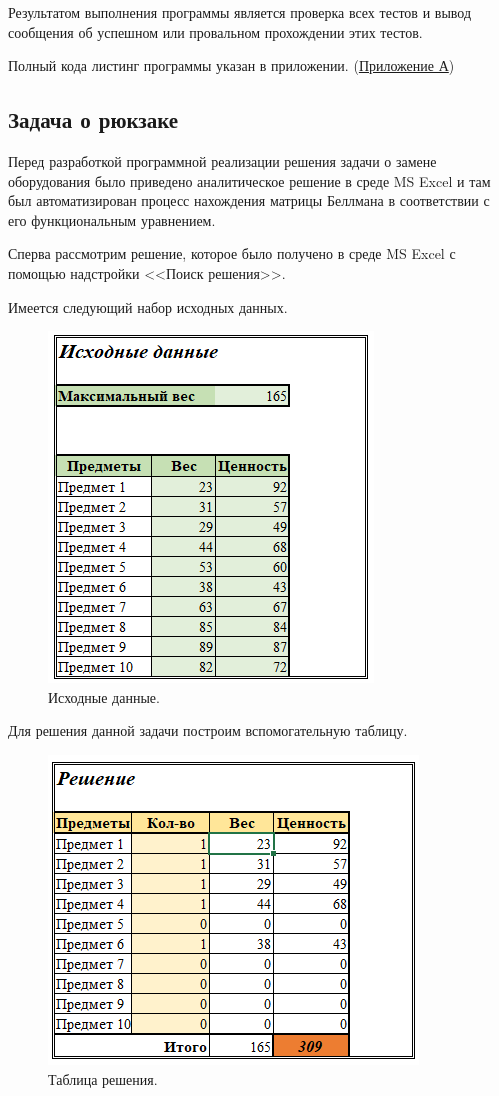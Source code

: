 Результатом выполнения программы является проверка всех тестов и вывод сообщения об успешном или провальном прохождении этих тестов. 

Полный кода листинг программы указан в приложении. (\hyperref[sec:appendix1]{Приложение А})


\subsection{Задача о рюкзаке}

\indent Перед разработкой программной реализации решения задачи о замене оборудования было приведено аналитическое решение в среде MS Excel и там был автоматизирован процесс нахождения матрицы Беллмана в соответствии с его функциональным уравнением.

Сперва рассмотрим решение, которое было получено в среде MS Excel с помощью надстройки <<Поиск решения>>.

Имеется следующий набор исходных данных.
\begin{figure}[h]
  \centering \includegraphics[scale=0.7]{content/images/impl_knapsack1.png}
  \caption{Исходные данные.}
  \label{fig:impl_knapsack1}
\end{figure}

Для решения данной задачи построим вспомогательную таблицу.
\begin{figure}[h]
  \centering \includegraphics[scale=0.8]{content/images/impl_knapsack2.png}
  \caption{Таблица решения.}
  \label{fig:impl_knapsack2}
\end{figure}

